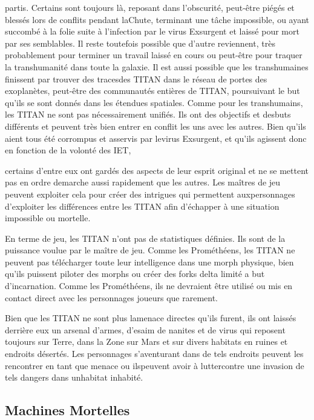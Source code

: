 {partis. Certains sont toujours là, reposant dans l'obscurité, peut-être piégés et blessés lors de conflits pendant laChute, terminant une tâche impossible, ou ayant succombé à la folie suite à l'infection par le virus Exsurgent et laissé pour mort par ses semblables. Il reste toutefois possible que d'autre reviennent, très probablement pour terminer un travail laissé en cours ou peut-être pour traquer la transhumanité dans toute la galaxie. Il est aussi possible que les transhumaines finissent par trouver des tracesdes TITAN dans le réseau de portes des exoplanètes, peut-être des communautés entières de TITAN, poursuivant le but qu'ils se sont donnés dans les étendues spatiales. Comme pour les transhumains, les TITAN ne sont pas nécessairement unifiés. Ils ont des objectifs et desbuts différents et peuvent très bien entrer en conflit les uns avec les autres. Bien qu'ils aient tous été corrompus et asservis par levirus Exsurgent, et qu'ils agissent donc en fonction de la volonté des IET, 

certains d'entre eux ont gardés des aspects de leur esprit original et ne se mettent pas en ordre demarche aussi rapidement que les autres. Les maîtres de jeu peuvent exploiter cela pour créer des intrigues qui permettent auxpersonnages d'exploiter les différences entre les TITAN afin d'échapper à une situation impossible ou mortelle. 

En terme de jeu, les TITAN n'ont pas de statistiques définies. Ils sont de la puissance voulue par le maître de jeu. Comme les Prométhéens, les TITAN ne peuvent pas télécharger toute leur intelligence dans une morph physique, bien qu'ils puissent piloter des morphs ou créer des forks delta limité a but d'incarnation. Comme les Prométhéens, ils ne devraient être utilisé ou mis en contact direct avec les personnages joueurs que rarement. 

Bien que les TITAN ne sont plus lamenace directes qu'ils furent, ils ont laissés derrière eux un arsenal d'armes, d'esaim de nanites et de virus qui reposent toujours sur Terre, dans la Zone sur Mars et sur divers habitats en ruines et endroits désertés. Les personnages s'aventurant dans de tels endroits peuvent les rencontrer en tant que menace ou ilspeuvent avoir à luttercontre une invasion de tels dangers dans unhabitat inhabité. 

\subsection{Machines Mortelles} 

}
